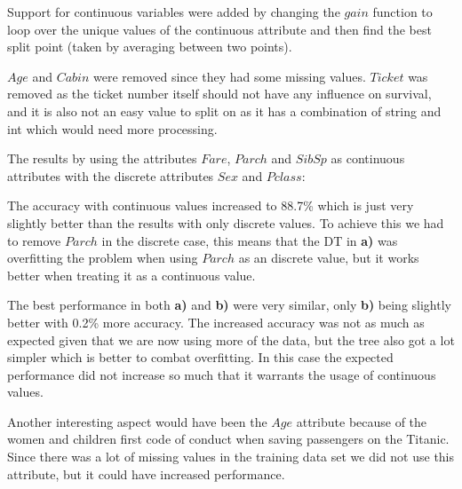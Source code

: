 \documentclass[11pt, english]{../Template/NTNUoving}
\begin{document}
\begin{oppgave}
\begin{punkt}
    \end{punkt}

    \begin{punkt}
        Support for continuous variables were added by changing the $gain$ function to
        loop over the unique values of the continuous attribute and then find the best split point (taken by averaging between two points).

        $Age$ and $Cabin$ were removed since they had some missing values. $Ticket$ was removed as the ticket number itself should not have
        any influence on survival, and it is also not an easy value to split on as it has a combination of string and int which would need more processing.

        The results by using the attributes $Fare$, $Parch$ and $SibSp$ as continuous attributes with the discrete attributes $Sex$ and $Pclass$:
        

        The accuracy with continuous values increased to 88.7\% which is just very slightly better than the results with only discrete values. To achieve this we had to remove $Parch$ in the discrete case,
        this means that the DT in \textbf{a)} was overfitting the problem when using $Parch$ as an discrete value, but it works better when treating it as a continuous value.
    \end{punkt}

    \begin{punkt}
        The best performance in both \textbf{a)} and \textbf{b)} were very similar, only \textbf{b)} being slightly better with 0.2\% more accuracy. The increased accuracy was not as much as expected given that we are now using more of the data,
        but the tree also got a lot simpler which is better to combat overfitting. In this case the expected performance did not increase so much that it warrants the usage of continuous values.

        Another interesting aspect would have been the $Age$ attribute because of the women and children first
        code of conduct when saving passengers on the Titanic\cite{women}. Since there was a lot of missing values in the training data set we did not use this attribute, but it could have increased performance.


\end{punkt}
\end{oppgave}
\end{document}
